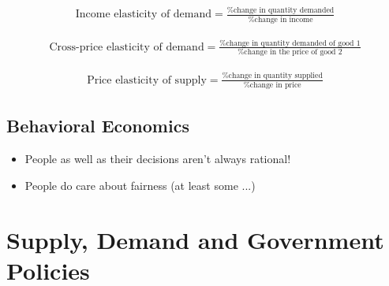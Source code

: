 \documentclass[a4paper,titlepage] {scrartcl}
\begin{document}
\begin{eqnarray*}
	\text{Income elasticity of demand} = 
	\frac{\text{\% change in quantity demanded}}{\text{\% change in income}}
\end{eqnarray*}

\begin{eqnarray*}
	\text{Cross-price elasticity of demand} = 
	\frac{\text{\% change in quantity demanded of good 1}}{\text{\% change in the price of good 2}}
\end{eqnarray*}

\begin{eqnarray*}
	\text{Price elasticity of supply} = 
	\frac{\text{\% change in quantity supplied}}{\text{\% change in price}}
\end{eqnarray*}

\subsection{Behavioral Economics}
\begin{itemize}
	\item People as well as their decisions aren't always rational!
	\item People do care about fairness (at least some ...)
\end{itemize}

\section{Supply, Demand and Government Policies}
\end{document}
